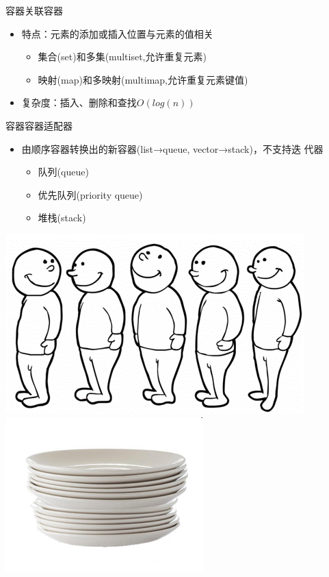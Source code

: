 \begin{frame}[t, fragile]{容器}{关联容器}%
  \stretchon
  \begin{itemize}
  \item 特点：元素的添加或插入位置与元素的值相关
    \begin{itemize}
    \item 集合(set)和多集(multiset,允许重复元素)
    \item 映射(map)和多映射(multimap,允许重复元素键值)
    \end{itemize}
  \item 复杂度：插入、删除和查找$O(log(n))$
  \end{itemize}
  \stretchoff
\end{frame}

\begin{frame}[t, fragile]{容器}{容器适配器}%
  \stretchon
  \begin{itemize}
  \item 由顺序容器转换出的新容器(list→queue, vector→stack)，\alert{不支持迭
    代器}
    \begin{itemize}
    \item 队列(queue)
    \item 优先队列(priority queue)
    \item 堆栈(stack)
    \end{itemize}
  \end{itemize}
  \stretchoff
  \begin{center}
    \includegraphics[height=0.23\textheight]{figure/chap07/06queue}
    \includegraphics[height=0.23\textheight]{figure/chap07/07stack}
  \end{center}  
\end{frame}

